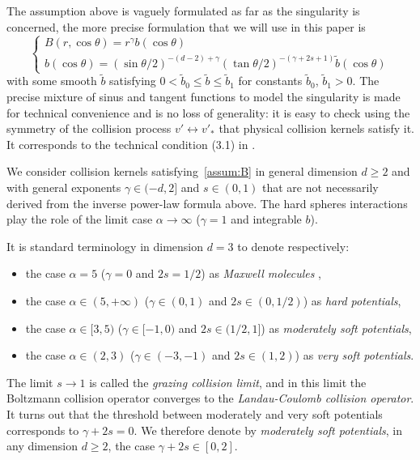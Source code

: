 \documentclass[JEP,XML,SOM,Unicode,NoFloatCountersInSection]{cedram}
\theoremstyle{plain}
\theoremstyle{definition}
\numberwithin{equation}{section}
\begin{document}
The assumption above is vaguely formulated as far as the singularity
is concerned, the more precise formulation that we will use in this
paper is
\begin{equation}\label{assum:B}
\begin{cases}
B(r,\cos \theta) = r^\gamma b(\cos \theta) \\[2mm]
b(\cos \theta) = (\sin \theta/2)^{-(d-2)+\gamma} (\tan
\theta/2)^{-(\gamma+2s+1)} \tilde b(\cos \theta)
\end{cases}
\end{equation}
with some smooth $\tilde b$ satisfying
$0 < \tilde b_0 \le \tilde b \le \tilde b_1$ for constants
$\tilde b_0$, $\tilde b_1>0$.
The precise mixture of sinus and tangent functions to model the
singularity is made for technical convenience and is no loss of
generality: it is easy to check using the symmetry of the collision
process $v' \leftrightarrow v'_*$ that physical collision kernels
satisfy it. It corresponds to the technical condition (3.1) in \cite{luis}.

We consider collision kernels satisfying~\eqref{assum:B} in general
dimension $d \ge 2$ and with general exponents $\gamma \in (-d,2]$ and
$s \in (0,1)$ that are not necessarily derived from the inverse
power-law formula above. The hard spheres interactions play the role
of the limit case $\alpha \to \infty$ ($\gamma=1$ and integrable $b$).

It is standard terminology in dimension $d=3$ to denote respectively:
\begin{itemize}
\item
the case $\alpha=5$ ($\gamma=0$ and $2s=1/2$) as \emph{Maxwell
molecules} \cite{Maxwell1867},
\item
the case $\alpha \in (5,+\infty)$ ($\gamma \in (0,1)$ and
$2s \in (0,1/2)$) as \emph{hard potentials},
\item
the case $\alpha \in [3,5)$ ($\gamma \in [-1,0)$ and
$2s \in (1/2,1]$) as \emph{moderately soft potentials},
\item
the case $\alpha \in (2,3)$ ($\gamma \in (-3,-1)$ and
$2s \in (1,2)$) as \emph{very soft potentials}.
\end{itemize}

The limit $s \to 1$ is called the \emph{grazing collision limit}, and
in this limit the Boltzmann collision operator converges to
the \emph{Landau-Coulomb collision operator}. It turns out that the
threshold between moderately and very soft potentials corresponds to
\hbox{$\gamma + 2s =0$}. We therefore denote by \emph{moderately soft
potentials}, in any dimension $d \ge 2$, the case
$\gamma + 2s \in [0,2]$.
\end{document}
